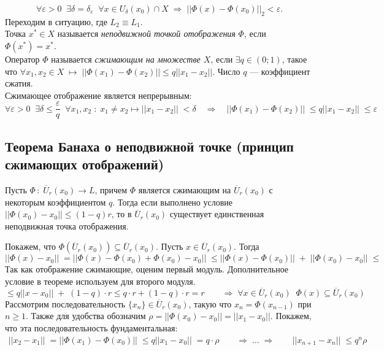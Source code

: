 \[\forall\varepsilon > 0 \;\; \exists\delta=\delta_{\varepsilon} \;\; \forall x \in U_\delta (x_0) \cap X \;\Rightarrow\; {||\Phi(x) - \Phi(x_0)||_2} < \varepsilon.\]
\bigbreak
Переходим в ситуацию, где $L_2 \equiv L_1$.
\\
\Def Точка $x^* \in X$ называется \textit{неподвижной точкой отображения} $\Phi$, если $\Phi(x^*) = x^*$.
\\
\Def Оператор $\Phi$ называется \textit{сжимающим на множестве $X$}, если $\exists q \in (0;1)$, такое что $\forall x_1, x_2 \in X \; \mapsto \; ||\Phi(x_1) - \Phi(x_2)|| \leqslant q||x_1 - x_2||$. Число $q$ — коэффициент сжатия.
\\
\Statement Сжимающее отображение является непрерывным:
\begin{equation*}
    \forall \varepsilon > 0 \;\; \exists \delta \leqslant \frac{\varepsilon}{q} \;\; \forall x_1,x_2 \; : \; x_1 \neq x_2 \mapsto ||x_1-x_2|| \;< \delta \quad \Rightarrow \quad ||\Phi(x_1)-\Phi(x_2)|| \;\leqslant q||x_1 - x_2|| \;\leqslant \varepsilon 
\end{equation*}

\subsection*{Теорема Банаха о неподвижной точке (принцип сжимающих отображений)}

Пусть $\Phi \,:\; \overline{U}_r (x_0) \to L$, причем $\Phi$ является сжимающим на $\overline{U}_r (x_0)$ с некоторым коэффициентом $q$. Тогда если выполнено условие $||\Phi(x_0) - x_0|| \leqslant (1-q)r$, то  в $\overline{U}_r (x_0)$ существует единственная неподвижная точка отображения.

\Proof Покажем, что $\Phi(\overline{U}_r(x_0))\subseteq\overline{U}_r(x_0)$. Пусть $x\in\overline{U}_r(x_0)$. Тогда 
\begin{equation*}
    ||\Phi(x) - x_0||\; = ||\Phi(x) -\Phi(x_0) + \Phi(x_0) - x_0||\; \leqslant ||\Phi(x) -\Phi(x_0)||\; +\; ||\Phi(x_0) - x_0||\; \leqslant
\end{equation*}
Так как отображение сжимающие, оценим первый модуль. Дополнительное условие в теореме используем для второго модуля.
\begin{equation*}
    \leqslant q||x - x_0|| \;+\; (1-q)\cdot r \leqslant q\cdot r + (1-q)\cdot r = r \qquad \Rightarrow \; \forall x \in \overline{U}_r(x_0) \;\; \Phi(x)\subseteq\overline{U}_r(x_0)
\end{equation*}
Рассмотрим последовательность $\{x_n\}\in\overline{U}_r(x_0)$, такую что $x_n = \Phi(x_{n-1})$ при $n \geqslant 1$. Также для удобства обозначим $\rho = ||\Phi(x_0) - x_0|| = ||x_1 - x_0||$. Покажем, что эта последовательность фундаментальная:
\begin{align*}
    ||x_2 - x_1|| \;= ||\Phi(x_1) - \Phi(x_0)||\; \leqslant q||x_1 - x_0||\; = q \cdot\rho \qquad \Rightarrow \;\ldots \; \Rightarrow\qquad
    ||x_{n+1} - x_n|| \;\leqslant q^n \rho
\end{align*}

